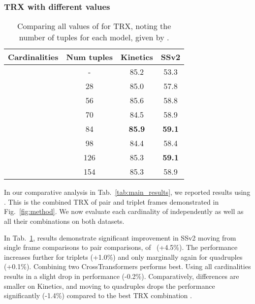 \documentclass[final]{cvpr}
\begin{document}
\subsubsection{TRX with different  values}\label{sec:ablation_cardinalities}


\begin{table}
\small
\centering 
\begin{tabular}{lccc}
\toprule
Cardinalities           &   Num tuples  &   Kinetics        &   SSv2 \\ \midrule
        &   -               & 85.2              & 53.3      \\   
        &   28              & 85.0              & 57.8          \\ 
        &   56              & 85.6              & 58.8          \\ 
        &   70              & 84.5              & 58.9          \\ 
      &   84              &   \textbf{85.9}            & \textbf{59.1}       \\
      &   98             & 84.4              & 58.4       \\
      &   126             &  85.3             & \textbf{59.1}       \\
    &   154             &  85.3             & 58.9       \\
\bottomrule
\end{tabular}
\caption{Comparing all values of  for TRX, noting the number of tuples for each model, given by .}
\vspace*{-5pt}
\label{tab:cardinalities_1}
\end{table}

In our comparative analysis in Tab.~\ref{tab:main_results}, we reported results using . This is the combined TRX of pair and triplet frames demonstrated in Fig.~\ref{fig:method}. We now evaluate each cardinality of  independently as well as all their combinations on both datasets.


In Tab.~\ref{tab:cardinalities_1}, results demonstrate significant improvement in SSv2 moving from single frame comparisons to pair comparisons, of ~(+4.5\%). The performance increases further for triplets (+1.0\%) and only marginally again for quadruples (+0.1\%). 
Combining two CrossTransformers  performs best.
Using all cardinalities  results in a slight drop in performance (-0.2\%).
Comparatively, differences are smaller on Kinetics, and moving to quadruples drops the performance significantly (-1.4\%) compared to the best TRX combination .
\end{document}
